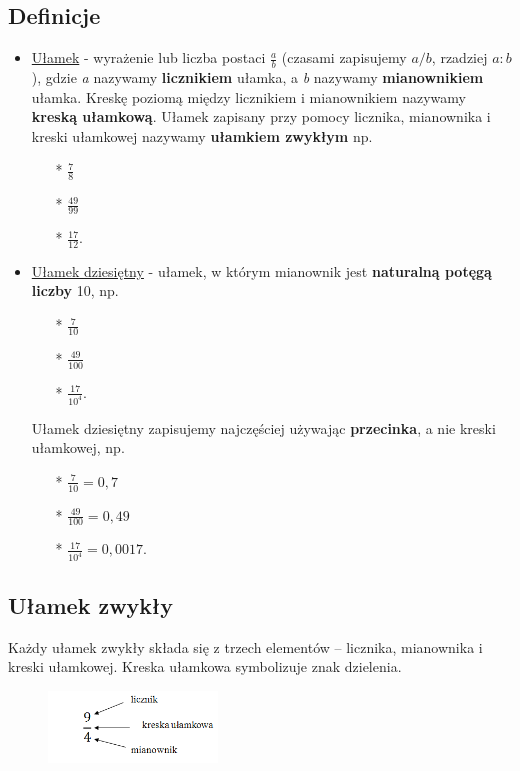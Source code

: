 \documentclass[12pt, a4paper]{article}
\begin{document}
\subsection{Definicje}
\begin{itemize}
\item \underline{Ułamek} - wyrażenie lub liczba postaci $\frac{a}{b}$ (czasami zapisujemy $a/b$, rzadziej $a:b$), gdzie \emph{a} nazywamy \textbf{licznikiem} ułamka, a \emph{b} nazywamy \textbf{mianownikiem} ułamka. Kreskę poziomą między licznikiem i mianownikiem nazywamy \textbf{kreską ułamkową}. Ułamek zapisany przy pomocy licznika, mianownika i kreski ułamkowej nazywamy \textbf{ułamkiem zwykłym} np.
		\begin{itemize}
			\item [*]$\frac{7}{8}$
			\item [*]$\frac{49}{99}$
			\item [*]$\frac{17}{12}$. 
		\end{itemize}
\item \underline{Ułamek dziesiętny} - ułamek, w którym mianownik jest \textbf{naturalną potęgą liczby} 10, np. 
		\begin{itemize}
			\item [*]$\frac{7}{10}$
			\item [*]$\frac{49}{100}$
			\item [*]$\frac{17}{10^4}$. 
		\end{itemize}
	Ułamek dziesiętny zapisujemy najczęściej używając \textbf{przecinka}, a nie kreski ułamkowej, np. 
		\begin{itemize}
			\item [*]$\frac{7}{10} = 0,7$
			\item [*]$\frac{49}{100} = 0,49$
			\item [*]$\frac{17}{10^4} = 0,0017$.
	\end{itemize}
\end{itemize}\cite{matemaks} 
\newpage\subsection{Ułamek zwykły}
Każdy ułamek zwykły składa się z trzech elementów – licznika, mianownika i kreski ułamkowej. Kreska ułamkowa symbolizuje znak dzielenia.
\begin{figure}[htbp]
	\centering
		\includegraphics[width=0.40\textwidth]{definicja.png}
	\label{fig:definicja}
\end{figure}
\end{document}
